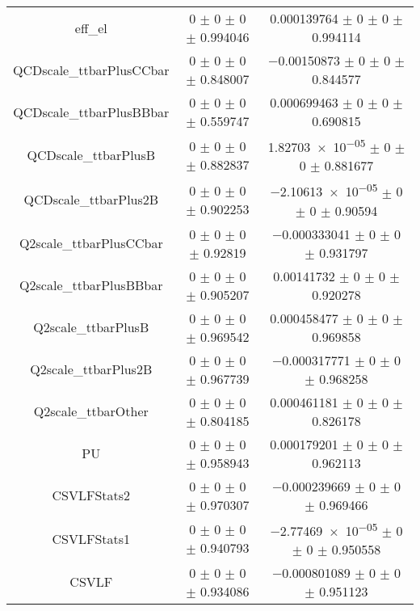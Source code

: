 \begin{table}
\begin{tabular}{ccc}
eff\_el 	& \num{0} $\pm$ \num{0} $\pm$ \num{0} $\pm$ \num{0.994046} 	& \num{0.000139764} $\pm$ \num{0} $\pm$ \num{0} $\pm$ \num{0.994114}\\
QCDscale\_ttbarPlusCCbar 	& \num{0} $\pm$ \num{0} $\pm$ \num{0} $\pm$ \num{0.848007} 	& \num{-0.00150873} $\pm$ \num{0} $\pm$ \num{0} $\pm$ \num{0.844577}\\
QCDscale\_ttbarPlusBBbar 	& \num{0} $\pm$ \num{0} $\pm$ \num{0} $\pm$ \num{0.559747} 	& \num{0.000699463} $\pm$ \num{0} $\pm$ \num{0} $\pm$ \num{0.690815}\\
QCDscale\_ttbarPlusB 	& \num{0} $\pm$ \num{0} $\pm$ \num{0} $\pm$ \num{0.882837} 	& \num{1.82703e-05} $\pm$ \num{0} $\pm$ \num{0} $\pm$ \num{0.881677}\\
QCDscale\_ttbarPlus2B 	& \num{0} $\pm$ \num{0} $\pm$ \num{0} $\pm$ \num{0.902253} 	& \num{-2.10613e-05} $\pm$ \num{0} $\pm$ \num{0} $\pm$ \num{0.90594}\\
Q2scale\_ttbarPlusCCbar 	& \num{0} $\pm$ \num{0} $\pm$ \num{0} $\pm$ \num{0.92819} 	& \num{-0.000333041} $\pm$ \num{0} $\pm$ \num{0} $\pm$ \num{0.931797}\\
Q2scale\_ttbarPlusBBbar 	& \num{0} $\pm$ \num{0} $\pm$ \num{0} $\pm$ \num{0.905207} 	& \num{0.00141732} $\pm$ \num{0} $\pm$ \num{0} $\pm$ \num{0.920278}\\
Q2scale\_ttbarPlusB 	& \num{0} $\pm$ \num{0} $\pm$ \num{0} $\pm$ \num{0.969542} 	& \num{0.000458477} $\pm$ \num{0} $\pm$ \num{0} $\pm$ \num{0.969858}\\
Q2scale\_ttbarPlus2B 	& \num{0} $\pm$ \num{0} $\pm$ \num{0} $\pm$ \num{0.967739} 	& \num{-0.000317771} $\pm$ \num{0} $\pm$ \num{0} $\pm$ \num{0.968258}\\
Q2scale\_ttbarOther 	& \num{0} $\pm$ \num{0} $\pm$ \num{0} $\pm$ \num{0.804185} 	& \num{0.000461181} $\pm$ \num{0} $\pm$ \num{0} $\pm$ \num{0.826178}\\
PU 	& \num{0} $\pm$ \num{0} $\pm$ \num{0} $\pm$ \num{0.958943} 	& \num{0.000179201} $\pm$ \num{0} $\pm$ \num{0} $\pm$ \num{0.962113}\\
CSVLFStats2 	& \num{0} $\pm$ \num{0} $\pm$ \num{0} $\pm$ \num{0.970307} 	& \num{-0.000239669} $\pm$ \num{0} $\pm$ \num{0} $\pm$ \num{0.969466}\\
CSVLFStats1 	& \num{0} $\pm$ \num{0} $\pm$ \num{0} $\pm$ \num{0.940793} 	& \num{-2.77469e-05} $\pm$ \num{0} $\pm$ \num{0} $\pm$ \num{0.950558}\\
CSVLF 	& \num{0} $\pm$ \num{0} $\pm$ \num{0} $\pm$ \num{0.934086} 	& \num{-0.000801089} $\pm$ \num{0} $\pm$ \num{0} $\pm$ \num{0.951123}\\

\end{tabular}
\end{table}
